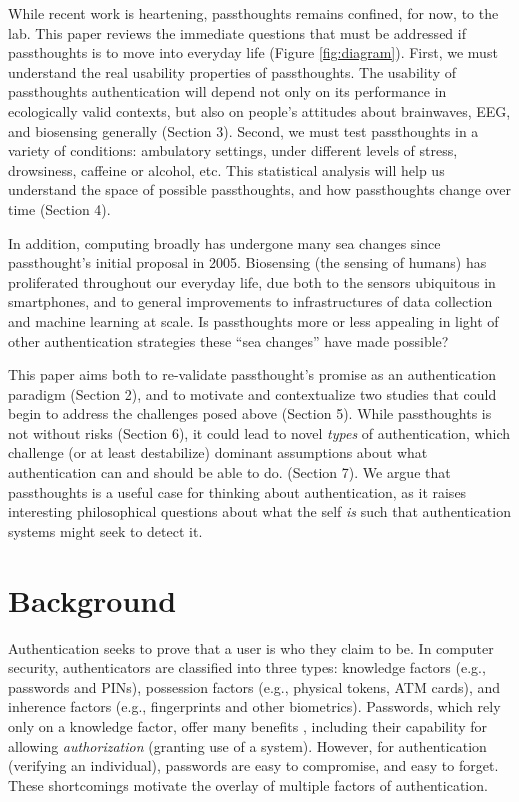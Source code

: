 \documentclass[sigconf]{acmart}
\begin{document}
While recent work is heartening, passthoughts remains confined, for now, to the
lab. This paper reviews the immediate questions that must be addressed if
passthoughts is to move into everyday life (Figure \ref{fig:diagram}). First, we
must understand the real usability properties of passthoughts. The usability of
passthoughts authentication will depend not only on its performance in
ecologically valid contexts, but also on people's attitudes about brainwaves,
EEG, and biosensing generally (Section 3). Second, we must test passthoughts in
a variety of conditions: ambulatory settings, under different levels of stress,
drowsiness, caffeine or alcohol, etc. This statistical analysis will help us
understand the space of possible passthoughts, and how passthoughts change over
time (Section 4).

In addition, computing broadly has undergone many sea changes since
passthought's initial proposal in 2005. Biosensing (the sensing of humans) has
proliferated throughout our everyday life, due both to the sensors ubiquitous in
smartphones, and to general improvements to infrastructures of data collection
and machine learning at scale. Is passthoughts more or less appealing in light
of other authentication strategies these ``sea changes'' have made possible?

This paper aims both to re-validate passthought's promise as an authentication
paradigm (Section 2), and to motivate and contextualize two studies that could
begin to address the challenges posed above (Section 5). While passthoughts is
not without risks (Section 6), it could lead to novel \emph{types} of authentication,
which challenge (or at least destabilize) dominant assumptions about what
authentication can and should be able to do. (Section 7). We argue
that passthoughts is a useful case for thinking about authentication, as it
raises interesting philosophical questions about what the self \emph{is} such that
authentication systems might seek to detect it.

\section{Background}
\label{sec:orgc2af2a9}

Authentication seeks to prove that a user is who they claim to be. In computer
security, authenticators are classified into three types: knowledge factors
(e.g., passwords and PINs), possession factors (e.g., physical tokens, ATM
cards), and inherence factors (e.g., fingerprints and other biometrics).
Passwords, which rely only on a knowledge factor, offer many benefits
\cite{Bonneau2012}, including their capability for allowing \emph{authorization}
(granting use of a system). However, for authentication (verifying an
individual), passwords are easy to compromise, and easy to forget. These
shortcomings motivate the overlay of multiple factors of authentication.
\end{document}
